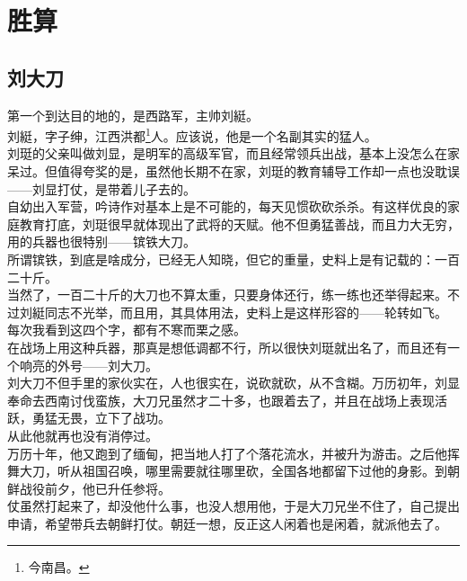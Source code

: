 \section{胜算}
\ifnum{}
	\begin{multicols}{\theparacolNo}
\fi
\subsection{刘大刀}
第一个到达目的地的，是西路军，主帅刘綎。\\

刘綎，字子绅，江西洪都\footnote{今南昌。}人。应该说，他是一个名副其实的猛人。\\

刘珽的父亲叫做刘显，是明军的高级军官，而且经常领兵出战，基本上没怎么在家呆过。但值得夸奖的是，虽然他长期不在家，刘珽的教育辅导工作却一点也没耽误——刘显打仗，是带着儿子去的。\\

自幼出入军营，吟诗作对基本上是不可能的，每天见惯砍砍杀杀。有这样优良的家庭教育打底，刘珽很早就体现出了武将的天赋。他不但勇猛善战，而且力大无穷，用的兵器也很特别——镔铁大刀。\\

所谓镔铁，到底是啥成分，已经无人知晓，但它的重量，史料上是有记载的：一百二十斤。\\

当然了，一百二十斤的大刀也不算太重，只要身体还行，练一练也还举得起来。不过刘綎同志不光举，而且用，其具体用法，史料上是这样形容的——轮转如飞。\\

每次我看到这四个字，都有不寒而栗之感。\\

在战场上用这种兵器，那真是想低调都不行，所以很快刘珽就出名了，而且还有一个响亮的外号——刘大刀。\\

刘大刀不但手里的家伙实在，人也很实在，说砍就砍，从不含糊。万历初年，刘显奉命去西南讨伐蛮族，大刀兄虽然才二十多，也跟着去了，并且在战场上表现活跃，勇猛无畏，立下了战功。\\

从此他就再也没有消停过。\\

万历十年，他又跑到了缅甸，把当地人打了个落花流水，并被升为游击。之后他挥舞大刀，听从祖国召唤，哪里需要就往哪里砍，全国各地都留下过他的身影。到朝鲜战役前夕，他已升任参将。\\

仗虽然打起来了，却没他什么事，也没人想用他，于是大刀兄坐不住了，自己提出申请，希望带兵去朝鲜打仗。朝廷一想，反正这人闲着也是闲着，就派他去了。\\


\end{multicols}
